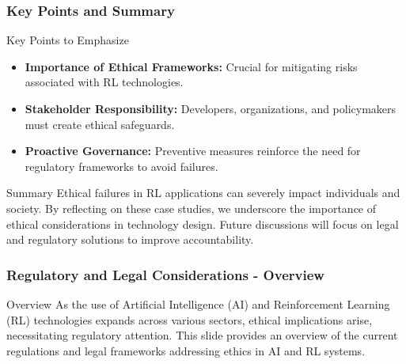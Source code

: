 \documentclass{beamer}
\begin{document}
\begin{frame}[fragile]
    \frametitle{Key Points and Summary}
    \begin{block}{Key Points to Emphasize}
        \begin{itemize}
            \item \textbf{Importance of Ethical Frameworks:} Crucial for mitigating risks associated with RL technologies.
            \item \textbf{Stakeholder Responsibility:} Developers, organizations, and policymakers must create ethical safeguards.
            \item \textbf{Proactive Governance:} Preventive measures reinforce the need for regulatory frameworks to avoid failures.
        \end{itemize}
    \end{block}
    
    \begin{block}{Summary}
        Ethical failures in RL applications can severely impact individuals and society. By reflecting on these case studies, we underscore the importance of ethical considerations in technology design. Future discussions will focus on legal and regulatory solutions to improve accountability.
    \end{block}
\end{frame}

\begin{frame}[fragile]
    \frametitle{Regulatory and Legal Considerations - Overview}
    \begin{block}{Overview}
        As the use of Artificial Intelligence (AI) and Reinforcement Learning (RL) technologies expands across various sectors, ethical implications arise, necessitating regulatory attention. This slide provides an overview of the current regulations and legal frameworks addressing ethics in AI and RL systems.
    \end{block}
\end{frame}
\end{document}
